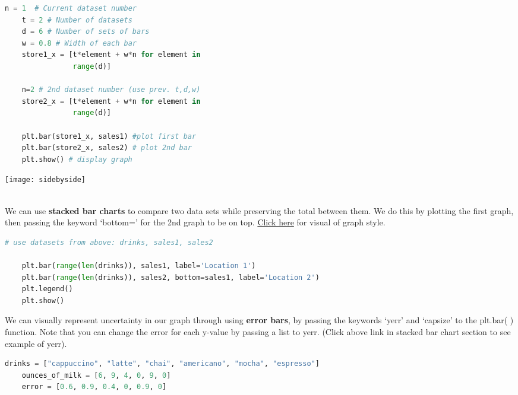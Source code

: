 \documentclass[11pt, a4paper]{article}
\begin{document}
\begin{spacing}{1.1}
\begin{minipage}[c]{9.2cm}
\begin{lstlisting}[language=Python]
	n = 1  # Current dataset number
	t = 2 # Number of datasets
	d = 6 # Number of sets of bars
	w = 0.8 # Width of each bar
	store1_x = [t*element + w*n for element in 
	            range(d)]
		
	n=2 # 2nd dataset number (use prev. t,d,w)
	store2_x = [t*element + w*n for element in 
	            range(d)]
	
	plt.bar(store1_x, sales1) #plot first bar
	plt.bar(store2_x, sales2) # plot 2nd bar
	plt.show() # display graph \end{lstlisting}\vspace*{1mm}
	\end{minipage}
	\begin{minipage}[c]{8cm}
		\texttt{[image: sidebyside]}
	\end{minipage} \vspace*{1mm} \\
	We can use \textbf{stacked bar charts} to compare two data sets while preserving the total between them. We do this by plotting the first graph, then passing the keyword `bottom=' for the 2nd graph to be on top. \href{https://matplotlib.org/3.1.1/gallery/lines_bars_and_markers/bar_stacked.html}{Click here} for visual of graph style.
	\begin{lstlisting}[language=Python]
	# use datasets from above: drinks, sales1, sales2 
	
	plt.bar(range(len(drinks)), sales1, label='Location 1')
	plt.bar(range(len(drinks)), sales2, bottom=sales1, label='Location 2')
	plt.legend()
	plt.show() \end{lstlisting}\vspace*{1mm}
	We can visually represent uncertainty in our graph through using \textbf{error bars}, by passing the keywords `yerr' and `capsize' to the plt.bar( ) function. Note that you can change the error for each y-value by passing a list to yerr. (Click above link in stacked bar chart section to see example of yerr).
	\begin{lstlisting}[language=Python]
	drinks = ["cappuccino", "latte", "chai", "americano", "mocha", "espresso"]
	ounces_of_milk = [6, 9, 4, 0, 9, 0]
	error = [0.6, 0.9, 0.4, 0, 0.9, 0]
	

\end{lstlisting}
\end{spacing}
\end{document}
